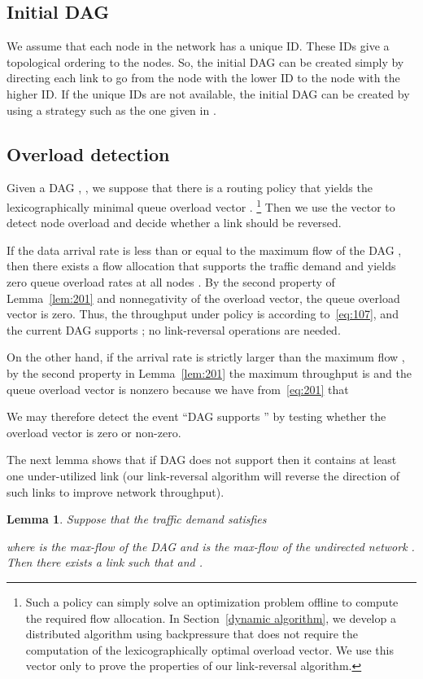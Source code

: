\documentclass{sig-alternate-2013}
\newtheorem{lemma}{Lemma}
\begin{document}
\subsection{Initial DAG}  \label{sec: initial dag}
We assume that each node in the network has a unique ID. These IDs give a topological ordering to the nodes. So, the initial DAG can be created simply by directing each link to go from the node with the lower ID to the node with the higher ID. If the unique IDs are not available, the initial DAG can be created by using a strategy such as the one given in \cite{tora}.



\subsection{Overload detection}

Given a DAG , , we suppose that there is a routing policy  that yields the lexicographically minimal queue overload vector . \footnote{Such a policy  can simply solve an optimization problem offline to compute the required flow allocation. In Section~\ref{dynamic algorithm}, we develop a distributed algorithm using backpressure that does not require the computation of the lexicographically optimal overload vector. We use this vector only to prove the properties of our link-reversal algorithm.} 
Then we use the vector 
to detect node overload and decide whether a link should be reversed.

If the data arrival rate  is less than or equal to the maximum flow  of the DAG , then there exists a flow allocation  that supports the traffic demand and yields zero queue overload rates  at all nodes . By  the second property of Lemma~\ref{lem:201} and nonnegativity of the overload vector,
the queue overload vector  is zero.
 Thus, the throughput under policy  is    according to~\eqref{eq:107}, and the current DAG   supports ; no link-reversal operations are needed. 

On the other hand, if the arrival rate  is strictly larger than the maximum flow , 
by the second property in Lemma~\ref{lem:201}  
the maximum throughput is  and
the queue overload vector  is nonzero because we have  from~\eqref{eq:201} that

We may therefore detect the event ``DAG   supports '' by testing whether  the overload vector 
 is zero or  non-zero.

The next lemma shows that if DAG   does not support  then it contains at least one  under-utilized link (our link-reversal algorithm will reverse the direction of such links to improve network throughput).
\begin{lemma}\label{lem: backward link}
Suppose that the traffic demand  satisfies

where  is the max-flow of the DAG  and  is the max-flow of the undirected network .
Then 
there exists a link  such that  and .
\end{lemma}
\end{document}
